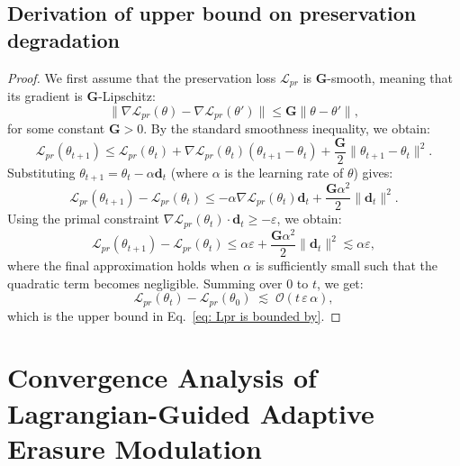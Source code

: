 \subsection{Derivation of upper bound on preservation degradation}
\label{appendix: Derivation of upper bound on preservation degradation}
\begin{proof}
We first assume that the preservation loss $\mathcal{L}_{pr}$ is $\mathbf{G}$-smooth, meaning that its gradient is $\mathbf{G}$-Lipschitz:
\begin{equation}
\|\nabla \mathcal{L}_{pr}(\theta) - \nabla \mathcal{L}_{pr}(\theta')\| \le \mathbf{G}\|\theta-\theta'\|,
\end{equation}
for some constant $\mathbf{G} > 0$. By the standard smoothness inequality, we obtain:
\begin{equation}
    \mathcal{L}_{pr}(\theta_{t+1}) \le \mathcal{L}_{pr}(\theta_t) + \nabla \mathcal{L}_{pr}(\theta_t) ( \theta_{t+1}-\theta_t ) + \frac{\mathbf{G}}{2}\|\theta_{t+1}-\theta_t\|^2.
\end{equation}
Substituting $\theta_{t+1} = \theta_t - \alpha \mathbf{d}_t$ (where $\alpha$ is the learning rate of $\theta$) gives:
\begin{equation}
    \mathcal{L}_{pr}(\theta_{t+1}) - \mathcal{L}_{pr}(\theta_t) \le -\alpha \nabla \mathcal{L}_{pr}(\theta_t) \mathbf{d}_t + \frac{\mathbf{G}\alpha^2}{2}\|\mathbf{d}_t\|^2.
\end{equation}
Using the primal constraint $\nabla \mathcal{L}_{pr}(\theta_t) \cdot \mathbf{d}_t \ge -\varepsilon$, we obtain:
\begin{equation}
    \mathcal{L}_{pr}(\theta_{t+1}) - \mathcal{L}_{pr}(\theta_t) \le \alpha \varepsilon + \frac{\mathbf{G}\alpha^2}{2}\|\mathbf{d}_t\|^2 \lesssim \alpha \varepsilon,
\end{equation}
where the final approximation holds when $\alpha$ is sufficiently small such that the quadratic term becomes negligible. Summing over $0$ to $t$, we get:
\begin{equation}
    \mathcal{L}_{pr}(\theta_t)-\mathcal{L}_{pr}(\theta_0) \;\lesssim\; \mathcal{O}(t\,\varepsilon\,\alpha),
\end{equation}
which is the upper bound in Eq.~\ref{eq: Lpr is bounded by}.
\end{proof}


\section{Convergence Analysis of Lagrangian-Guided Adaptive Erasure Modulation}
\label{appendix: Convergence Analysis of Constraint-Aware Dynamic Balancing}

